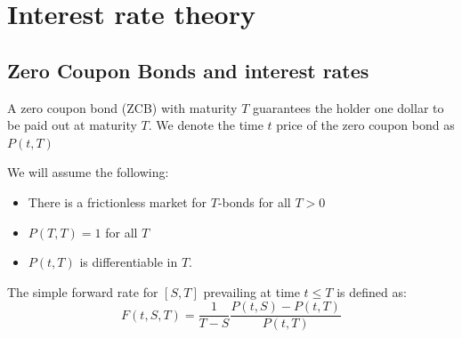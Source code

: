 \chapter{Interest rate theory}
\label{chp_interest_rate_theory}

\section{Zero Coupon Bonds and interest rates}

\begin{definition}
A zero coupon bond (ZCB)  with maturity $T$ guarantees the holder one dollar to be paid out at maturity $T$. We denote the time $t$ price of the zero coupon bond as $P(t,T)$
\end{definition}

We will assume the following: 
\begin{itemize}
    \item There is a frictionless market for $T$-bonds for all $T>0$
    \item $P(T,T) = 1$ for all $T$
    \item $P(t,T)$ is differentiable in $T$.
\end{itemize} 


\begin{definition}
\label{def: Simple_forward_rate}
The simple forward rate for $[S,T]$ prevailing at time $t\leq T$
is defined as: 
\begin{equation*}
F(t,S,T) = \frac{1}{T-S}\frac{P(t,S)-P(t,T)}{P(t,T)}    
\end{equation*}
\end{definition}


